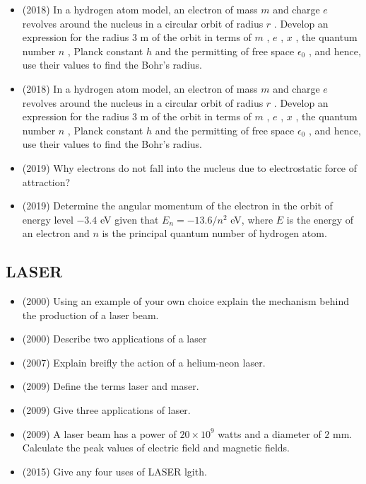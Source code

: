 \documentclass{article}
\begin{document}
\begin{itemize}
\item (2018)  In a hydrogen atom model, an electron of mass $ m$ and charge $ e$ revolves around the nucleus in a circular orbit of radius $ r$ . Develop an expression for the radius $ 3$ m of the orbit in terms of $ m$ , $ e$ , $ x$ , the quantum number $ n$ , Planck constant $ h$ and the permitting of free space $ \epsilon _{0}$ , and hence, use their values to find the Bohr’s radius. 
\item (2018)  In a hydrogen atom model, an electron of mass $ m$ and charge $ e$ revolves around the nucleus in a circular orbit of radius $ r$ . Develop an expression for the radius $ 3$ m of the orbit in terms of $ m$ , $ e$ , $ x$ , the quantum number $ n$ , Planck constant $ h$ and the permitting of free space $ \epsilon _{0}$ , and hence, use their values to find the Bohr’s radius. 
\item (2019)  Why electrons do not fall into the nucleus due to electrostatic force of attraction?
\item (2019)  Determine the angular momentum of the electron in the orbit of energy level $ -3.4$ eV given that $ E_{n}=-13.6/n^{2}$ eV, where $ E$ is the energy of an electron and $ n$ is the principal quantum number of hydrogen atom. 
\end{itemize}

\subsection{LASER}
\begin{itemize}
\item (2000)  Using an example of your own choice explain the mechanism behind the production of a laser beam.
\item (2000)  Describe two applications of a laser
\item (2007)  Explain breifly the action of a helium-neon laser.
\item (2009)  Define the terms laser and maser. 
\item (2009)  Give three applications of laser. 
\item (2009)  A laser beam has a power of $ 20 \times 10^{9}$ watts and a diameter of $ 2$ mm.  Calculate the peak values of electric field and magnetic fields.
\item (2015)  Give any four uses of LASER lgith.
\end{itemize}
\end{document}
